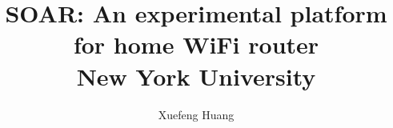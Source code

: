 \documentclass[12pt]{report}
\title{\textbf{SOAR: An experimental platform for home WiFi router} \\
        {New York University} \\}
\author{Xuefeng Huang}
\begin{document}
\maketitle
\tableofcontents
\listoffigures
\listoftables








\begin{appendices}

\end{appendices}
\newpage
\printbibliography
%
%
\end{document}
